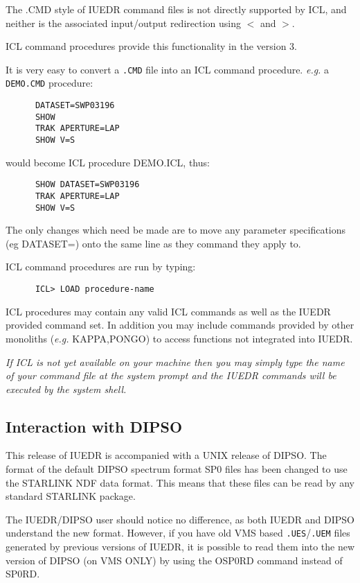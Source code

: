 The .CMD style of IUEDR command files is not directly supported by
ICL, and neither is the associated input/output redirection using
\(<\) and \(>\).

ICL command procedures provide this functionality in the version 3.

It is very easy to convert a {\tt .CMD} file into an ICL command procedure.
{\em e.g.} a {\tt DEMO.CMD} procedure:

\begin{verbatim}
      DATASET=SWP03196
      SHOW
      TRAK APERTURE=LAP
      SHOW V=S
\end{verbatim}

would become ICL procedure DEMO.ICL, thus:

\begin{verbatim}
      SHOW DATASET=SWP03196
      TRAK APERTURE=LAP
      SHOW V=S
\end{verbatim}

The only changes which need be made are to move any parameter
specifications (eg DATASET=) onto the same line as they  command they
apply to.

ICL command procedures are run by typing:

\begin{verbatim}
      ICL> LOAD procedure-name
\end{verbatim}

ICL procedures may contain any valid ICL commands as well as the IUEDR
provided command set. In addition you may  include commands provided
by other monoliths ({\em e.g.} KAPPA,PONGO) to access functions not
integrated into IUEDR.

{\em If ICL is not yet available on your machine then you may simply 
type the name of your command file at the system prompt and the
IUEDR commands will be executed by the system shell.}

\subsection{Interaction with DIPSO}

This release of IUEDR is accompanied with a UNIX release of DIPSO. The
format of the default DIPSO spectrum format SP0 files has been 
changed to use the STARLINK NDF data format. This means that these
files can be read by any standard STARLINK package.

The IUEDR/DIPSO user should notice no difference, as both IUEDR and
DIPSO understand the new format. However, if you have old VMS based
{\tt .UES}/{\tt .UEM} files generated by previous versions of IUEDR,
it is possible to read them into the new version of DIPSO (on VMS
ONLY) by using the OSP0RD command instead of SP0RD.

